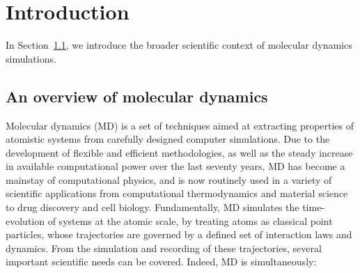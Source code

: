 \chapter{Introduction}
\label{chap:introduction}
In Section~\ref{sec:01:MD}, we introduce the broader scientific context of molecular dynamics simulations.
\section{An overview of molecular dynamics}
\label{sec:01:MD}
Molecular dynamics (MD) is a set of techniques aimed at extracting properties of atomistic systems from carefully designed computer simulations.
Due to the development of flexible and efficient methodologies, as well as the steady increase in available computational power over the last seventy years, MD has become a mainstay of computational physics, and is now routinely used in a variety of scientific applications from computational thermodynamics and material science to drug discovery and cell biology.
Fundamentally, MD simulates the time-evolution of systems at the atomic scale, by treating atoms as classical point particles, whose trajectories are governed by a defined set of interaction laws and dynamics. From the simulation and recording of these trajectories, several important scientific needs can be covered. Indeed, MD is simultaneously:
